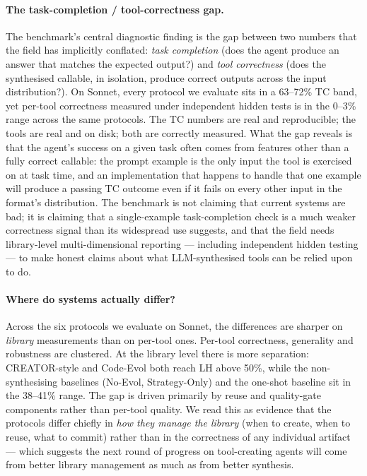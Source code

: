 \documentclass[sigplan,nonacm,natbib=false]{acmart}
\begin{document}
\paragraph{The task-completion / tool-correctness gap.}
\label{sec:discussion_tcgap}
The benchmark's central diagnostic finding is the gap between two numbers that the field has implicitly conflated: \emph{task completion} (does the agent produce an answer that matches the expected output?) and \emph{tool correctness} (does the synthesised callable, in isolation, produce correct outputs across the input distribution?). On Sonnet, every protocol we evaluate sits in a 63--72\% TC band, yet per-tool correctness measured under independent hidden tests is in the 0--3\% range across the same protocols. The TC numbers are real and reproducible; the tools are real and on disk; both are correctly measured. What the gap reveals is that the agent's success on a given task often comes from features other than a fully correct callable: the prompt example is the only input the tool is exercised on at task time, and an implementation that happens to handle that one example will produce a passing TC outcome even if it fails on every other input in the format's distribution. The benchmark is not claiming that current systems are bad; it is claiming that a single-example task-completion check is a much weaker correctness signal than its widespread use suggests, and that the field needs library-level multi-dimensional reporting --- including independent hidden testing --- to make honest claims about what LLM-synthesised tools can be relied upon to do.

\paragraph{Where do systems actually differ?} Across the six protocols we evaluate on Sonnet, the differences are sharper on \emph{library} measurements than on per-tool ones. Per-tool correctness, generality and robustness are clustered. At the library level there is more separation: CREATOR-style and Code-Evol both reach LH above 50\%, while the non-synthesising baselines (No-Evol, Strategy-Only) and the one-shot baseline sit in the 38--41\% range. The gap is driven primarily by reuse and quality-gate components rather than per-tool quality. We read this as evidence that the protocols differ chiefly in \emph{how they manage the library} (when to create, when to reuse, what to commit) rather than in the correctness of any individual artifact --- which suggests the next round of progress on tool-creating agents will come from better library management as much as from better synthesis.
\end{document}
